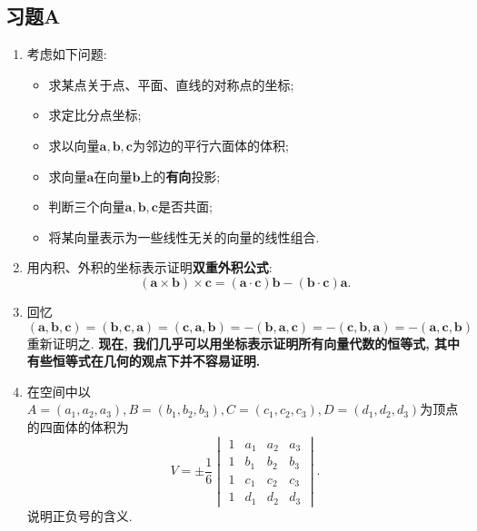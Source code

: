 \documentclass[./main.tex]{subfiles}
\begin{document}
\subsection*{习题A}
\begin{enumerate}
    \item 考虑如下问题: 
\begin{itemize}
    \item 求某点关于点、平面、直线的对称点的坐标; 
    \item 求定比分点坐标; 
    \item 求以向量$\mathbf{a},\mathbf{b},\mathbf{c}$为邻边的平行六面体的体积; 
    \item 求向量$\mathbf{a}$在向量$\mathbf{b}$上的\textbf{有向}投影; 
    \item 判断三个向量$\mathbf{a},\mathbf{b},\mathbf{c}$是否共面; 
    \item 将某向量表示为一些线性无关的向量的线性组合.
\end{itemize}
    \item 用内积、外积的坐标表示证明\textbf{双重外积公式}: $$(\mathbf{a}\times \mathbf{b})\times \mathbf{c}=(\mathbf{a}\cdot \mathbf{c})\mathbf{b}-(\mathbf{b}\cdot \mathbf{c})\mathbf{a}.$$
    \item 回忆$$(\mathbf{a},\mathbf{b},\mathbf{c})=(\mathbf{b},\mathbf{c},\mathbf{a})=(\mathbf{c},\mathbf{a},\mathbf{b})=-(\mathbf{b},\mathbf{a},\mathbf{c})=-(\mathbf{c},\mathbf{b},\mathbf{a})=-(\mathbf{a},\mathbf{c},\mathbf{b})$$重新证明之. \textbf{现在, 我们几乎可以用坐标表示证明所有向量代数的恒等式, 其中有些恒等式在几何的观点下并不容易证明.}
    \item 在空间中以$A=(a_1,a_2,a_3),B=(b_1,b_2,b_3),C=(c_1,c_2,c_3),D=(d_1,d_2,d_3)$为顶点的四面体的体积为$$V=\pm \frac{1}{6}\begin{vmatrix}
        1 & a_1 & a_2 & a_3\\
        1 & b_1 & b_2 & b_3\\
        1 & c_1 & c_2 & c_3\\
        1 & d_1 & d_2 & d_3
    \end{vmatrix}.$$说明正负号的含义.
\end{enumerate}
\end{document}
